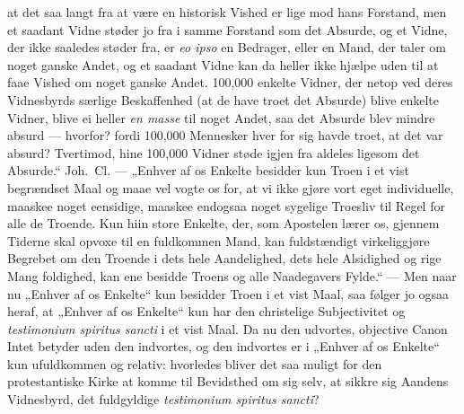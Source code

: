 at det saa langt fra at være en historisk Vished er lige mod hans
Forstand, men et saadant Vidne støder jo fra i samme Forstand som
det Absurde, og et Vidne, der ikke saaledes støder fra, er
\textit{eo ipso} en Bedrager, eller en Mand, der taler om noget
ganske Andet, og et saadant Vidne kan da heller ikke hjælpe uden
til at faae Vished om noget ganske Andet. 100,000 enkelte Vidner,
der netop ved deres Vidnesbyrds særlige Beskaffenhed (at de have
troet det Absurde) blive enkelte Vidner, blive ei heller
\textit{en masse} til noget Andet, saa det Absurde blev mindre
absurd --- hvorfor? fordi 100,000 Mennesker hver for sig havde
troet, at det var absurd? Tvertimod, hine 100,000 Vidner støde
igjen fra aldeles ligesom det Absurde.“ Joh.\ Cl. --- „Enhver af
os Enkelte besidder kun Troen i et vist begrændset Maal og maae
vel vogte os for, at vi ikke gjøre vort eget individuelle, maaskee
noget eensidige, maaskee endogsaa noget sygelige Troesliv til
Regel for alle de Troende. Kun hiin store Enkelte, der, som
Apostelen lærer os, gjennem Tiderne skal opvoxe til en fuldkommen
Mand, kan fuldstændigt virkeliggjøre Begrebet om den Troende i
dets hele Aandelighed, dets hele Alsidighed og rige Mang%
foldighed, kan ene besidde Troens og alle Naadegavers Fylde.“ ---
Men naar nu „Enhver af os Enkelte“ kun besidder Troen i et vist
Maal, saa følger jo ogsaa heraf, at „Enhver af os Enkelte“ kun har
den christelige Subjectivitet og \textit{testimonium spiritus
sancti} i et vist Maal. Da nu den udvortes, objective Canon Intet
betyder uden den indvortes, og den indvortes er i „Enhver af os
Enkelte“ kun ufuldkommen og relativ: hvorledes bliver det saa
muligt for den protestantiske Kirke at komme til Bevidsthed om sig
selv, at sikkre sig Aandens Vidnesbyrd, det fuldgyldige
\textit{testimonium spiritus sancti}?

